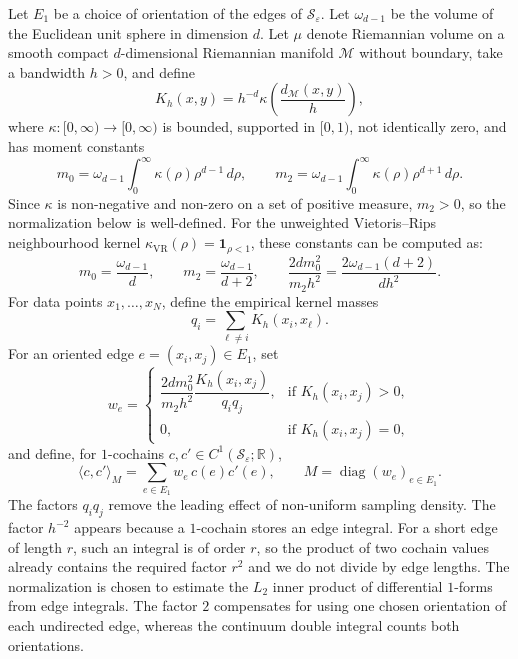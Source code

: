 \documentclass[a4paper,11pt, DIV=10]{scrartcl}
\numberwithin{equation}{section}
\theoremstyle{definition}
\theoremstyle{remark}
\newcommand{\R}{\mathbb{R}}
\newcommand{\mc}[1]{\mathcal{#1}}
\DeclareMathOperator{\diag}{diag}
\begin{document}
Let $E_1$ be a choice of orientation of the edges of $\mc{S}_\varepsilon$.
Let $\omega_{d-1}$ be the volume of the Euclidean unit sphere in dimension $d$.
Let $\mu$ denote Riemannian volume on a smooth compact $d$-dimensional Riemannian manifold $\mc{M}$ without boundary, take a bandwidth $h>0$, and define
\begin{equation}
K_h(x,y)=h^{-d}\kappa\!\left(\frac{d_{\mc{M}}(x,y)}{h}\right),
\end{equation}
where $\kappa\colon [0,\infty)\to[0,\infty)$ is bounded, supported in $[0,1)$, not identically zero, and has moment constants
\begin{equation}
m_0=\omega_{d-1}\int_0^\infty \kappa(\rho)\rho^{d-1}\,d\rho,
\qquad
m_2=\omega_{d-1}\int_0^\infty \kappa(\rho)\rho^{d+1}\,d\rho.
\end{equation}
Since $\kappa$ is non-negative and non-zero on a set of positive measure, $m_2>0$, so the normalization below is well-defined.
For the unweighted Vietoris--Rips neighbourhood kernel $\kappa_{\mathrm{VR}}(\rho)=\mathbf 1_{\rho<1}$, these constants can be computed as:
\begin{equation}
m_0=\frac{\omega_{d-1}}{d},
\qquad
m_2=\frac{\omega_{d-1}}{d+2},
\qquad
\frac{2dm_0^2}{m_2h^2}=\frac{2\omega_{d-1}(d+2)}{dh^2}.
\end{equation}
For data points $x_1,\dots,x_N$, define the empirical kernel masses
\begin{equation}
q_i=\sum_{\ell\neq i}K_h(x_i,x_\ell).
\end{equation}
For an oriented edge $e=(x_i,x_j)\in E_1$, set
\begin{equation}
w_e=
\begin{cases}
\dfrac{2dm_0^2}{m_2h^2}\dfrac{K_h(x_i,x_j)}{q_iq_j}, & \text{if } K_h(x_i,x_j)>0,\\[0.8ex]
0, & \text{if } K_h(x_i,x_j)=0,
\end{cases}
\end{equation}
and define, for $1$-cochains $c,c'\in C^1(\mc{S}_\varepsilon;\R)$,
\begin{equation}
\langle c,c'\rangle_M
=
\sum_{e\in E_1} w_e\,c(e)c'(e),
\qquad
M=\diag(w_e)_{e\in E_1}.
\end{equation}
The factors $q_iq_j$ remove the leading effect of non-uniform sampling density.
The factor $h^{-2}$ appears because a $1$-cochain stores an edge integral.
For a short edge of length $r$, such an integral is of order $r$, so the product of two cochain values already contains the required factor $r^2$ and we do not divide by edge lengths.
The normalization is chosen to estimate the $L_2$ inner product of differential $1$-forms from edge integrals.
The factor $2$ compensates for using one chosen orientation of each undirected edge, whereas the continuum double integral counts both orientations.
\end{document}
